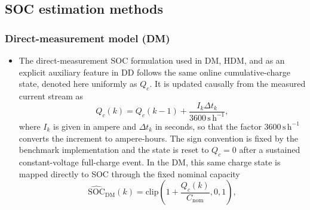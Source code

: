 \documentclass[review]{elsarticle}
\begin{document}
\subsection{SOC estimation methods}
\subsubsection{Direct-measurement model (DM)}
\begin{itemize}[leftmargin=*]
    \item The direct-measurement SOC formulation used in DM, HDM, and as an explicit auxiliary feature in DD follows the same online cumulative-charge state, denoted here uniformly as $Q_c$. It is updated causally from the measured current stream as
    \begin{equation}
        Q_c(k)=Q_c(k-1)+\frac{I_k \Delta t_k}{3600\,\mathrm{s\,h^{-1}}},
        \label{eq:qc_update}
    \end{equation}
    where $I_k$ is given in ampere and $\Delta t_k$ in seconds, so that the factor $3600\,\mathrm{s\,h^{-1}}$ converts the increment to ampere-hours. The sign convention is fixed by the benchmark implementation and the state is reset to $Q_c=0$ after a sustained constant-voltage full-charge event. In the DM, this same charge state is mapped directly to SOC through the fixed nominal capacity
    \begin{equation}
        \widehat{\mathrm{SOC}}_{\mathrm{DM}}(k)=\mathrm{clip}\!\left(1+\frac{Q_c(k)}{C_{\mathrm{nom}}},0,1\right),
        \label{eq:soc_dm}
    \end{equation}
\end{itemize}
\end{document}
